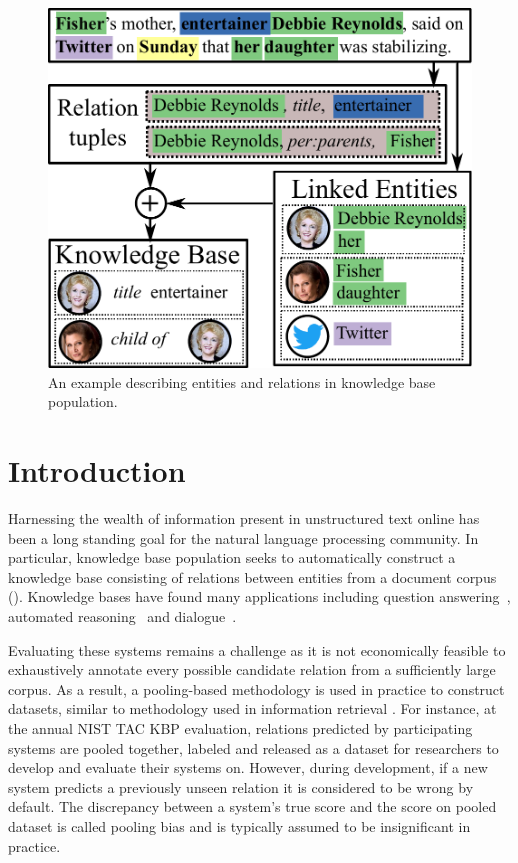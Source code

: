 \begin{figure}[t]
  \centering
  \includegraphics[width=0.9\columnwidth]{figures/entities-example.pdf}
  \caption{\label{fig:example} An example describing entities and relations in knowledge base population.}
\end{figure}

\section{Introduction}
\label{sec:intro}

Harnessing the wealth of information present in unstructured text online has been a long standing goal for the natural language processing community.
In particular, knowledge base population seeks to automatically construct a knowledge base consisting of relations between entities from a document corpus ().
Knowledge bases have found many applications including question answering~\citep{berant2013freebase, fader2014open,reddy2014large}, automated reasoning~\citep{kalyanpur2012structured} and dialogue~\citep{lee2015conversational,han2015exploiting}.

Evaluating these systems remains a challenge as it is not economically feasible to exhaustively annotate every possible candidate relation from a sufficiently large corpus.
As a result, a pooling-based methodology is used in practice to construct datasets, similar to methodology used in information retrieval \citep{sparck1975report, harman1993trec}.
For instance, at the annual NIST TAC KBP evaluation, relations predicted by participating systems are pooled together, labeled and released as a dataset for researchers to develop and evaluate their systems on.
However, during development, if a new system predicts a previously unseen relation it is considered to be wrong by default.
The discrepancy between a system's true score and the score on pooled dataset is called pooling bias and is typically assumed to be insignificant in practice.

